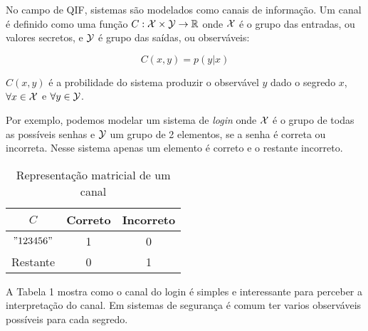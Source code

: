 
% 

No campo de QIF, sistemas são modelados como canais de informação. Um canal é definido como uma função $C: \mathcal{X} \times \mathcal{Y} \rightarrow \mathbb{R}$ onde $\mathcal{X}$ é o grupo das entradas, ou valores secretos, e $\mathcal{Y}$ é grupo das saídas, ou observáveis:

$$ C(x,y) = p(y|x) $$

$C(x,y)$ é a probilidade do sistema produzir o observável $y$ dado o segredo $x$, $\forall x \in \mathcal{X}$ e $\forall y \in \mathcal{Y}$.

Por exemplo, podemos modelar um sistema de \emph{login} onde $\mathcal{X}$ é o grupo de todas as possíveis senhas e $\mathcal{Y}$ um grupo de 2 elementos, se a senha é correta ou incorreta. Nesse sistema apenas um elemento é correto e o restante incorreto.
\begin{table}[h!]
\centering
\begin{tabular}{|c|c c|}
    \hline
    $C$   & Correto & Incorreto  \\
    \hline 
    $"123456"$&1&0\\
    Restante &0&1\\
    \hline
\end{tabular}
\caption{Representação matricial de um canal}
\label{Canal}
\end{table}
A Tabela 1 mostra como o canal do login é simples e interessante para perceber a interpretação do canal. Em sistemas de segurança é comum ter varios observáveis possíveis para cada segredo.

